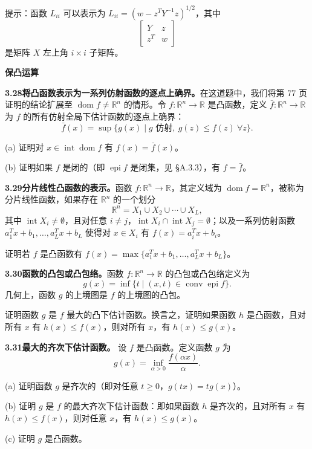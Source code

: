 \documentclass[UTF8,12pt,a4paper,fontset=fandol]{ctexart}
\DeclareMathOperator{\dom}{dom}
\begin{document}
提示：函数 $L_{ii}$ 可以表示为 $L_{ii}=(w-z^TY^{-1}z)^{1/2}$，其中
\[
\begin{bmatrix}
Y & z\\
z^T & w
\end{bmatrix}
\]
是矩阵 $X$ 左上角 $i\times i$ 子矩阵。

\noindent\textbf{保凸运算}

\noindent\textbf{3.28\quad 将凸函数表示为一系列仿射函数的逐点上确界。}\quad 在这道题中，我们将第 77 页证明的结论扩展至 $\dom f\neq\mathbb{R}^n$ 的情形。令 $f:\mathbb{R}^n\to\mathbb{R}$ 是凸函数，定义 $\bar f:\mathbb{R}^n\to\mathbb{R}$ 为 $f$ 的所有仿射全局下估计函数的逐点上确界：
\[
\bar f(x)=\sup\{g(x)\mid g\text{ 仿射},\ g(z)\leq f(z)\ \forall z\}.
\]

(a) 证明对 $x\in\operatorname{int}\dom f$ 有 $f(x)=\bar f(x)$。

(b) 证明如果 $f$ 是闭的（即 $\operatorname{epi} f$ 是闭集，见 \S A.3.3），有 $f=\bar f$。

\noindent\textbf{3.29\quad 分片线性凸函数的表示。}\quad 函数 $f:\mathbb{R}^n\to\mathbb{R}$，其定义域为 $\dom f=\mathbb{R}^n$，被称为分片线性函数，如果存在 $\mathbb{R}^n$ 的一个划分
\[
\mathbb{R}^n=X_1\cup X_2\cup\cdots\cup X_L,
\]
其中 $\operatorname{int}X_i\neq\emptyset$，且对任意 $i\neq j$，$\operatorname{int}X_i\cap\operatorname{int}X_j=\emptyset$；以及一系列仿射函数 $a_1^Tx+b_1,\ldots,a_L^Tx+b_L$ 使得对 $x\in X_i$ 有 $f(x)=a_i^Tx+b_i$。

证明若 $f$ 是凸函数有 $f(x)=\max\{a_1^Tx+b_1,\ldots,a_L^Tx+b_L\}$。

\noindent\textbf{3.30\quad 函数的凸包或凸包络。}\quad 函数 $f:\mathbb{R}^n\to\mathbb{R}$ 的凸包或凸包络定义为
\[
g(x)=\inf\{t\mid (x,t)\in\operatorname{conv}\operatorname{epi} f\}.
\]
几何上，函数 $g$ 的上境图是 $f$ 的上境图的凸包。

证明函数 $g$ 是 $f$ 最大的凸下估计函数。换言之，证明如果函数 $h$ 是凸函数，且对所有 $x$ 有 $h(x)\leq f(x)$，则对所有 $x$，有 $h(x)\leq g(x)$。

\noindent\textbf{3.31}\quad [Roc70，第 35 页] \textbf{最大的齐次下估计函数。} 设 $f$ 是凸函数。定义函数 $g$ 为
\[
g(x)=\inf_{\alpha>0}\frac{f(\alpha x)}{\alpha}.
\]

(a) 证明函数 $g$ 是齐次的（即对任意 $t\geq0$，$g(tx)=tg(x)$）。

(b) 证明 $g$ 是 $f$ 的最大齐次下估计函数：即如果函数 $h$ 是齐次的，且对所有 $x$ 有 $h(x)\leq f(x)$，则对任意 $x$，有 $h(x)\leq g(x)$。

(c) 证明 $g$ 是凸函数。
\end{document}
